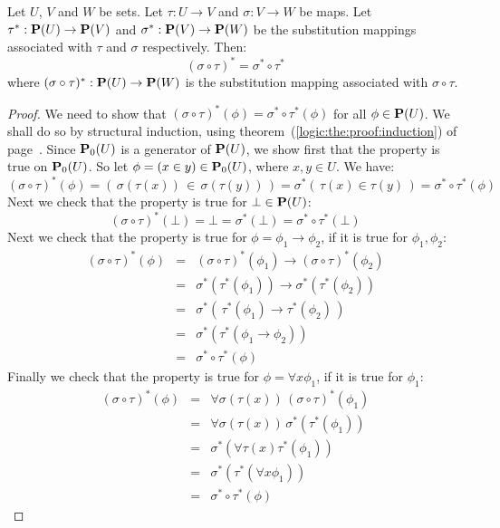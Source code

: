\begin{prop}\label{logic:prop:substitution:composition}
Let $U$, $V$ and $W$ be sets. Let $\tau:U\to V$ and $\sigma:V\to W$
be maps. Let $\tau^{*}:{\bf P}(U)\to\mbox{${\bf P}(V)$}$ and $\sigma^{*}:\mbox{${\bf P}(V)$}\to{\bf
P}(W)$ be the substitution mappings associated with $\tau$ and
$\sigma$ respectively. Then:
    \[
    (\sigma\circ\tau)^{*}=\sigma^{*}\circ\tau^{*}
    \]
where $(\sigma\circ\tau)^{*}:{\bf P}(U)\to {\bf P}(W)$ is the
substitution mapping associated with $\sigma\circ\tau$.
\end{prop}
\begin{proof}
We need to show that
$(\sigma\circ\tau)^{*}(\phi)=\sigma^{*}\circ\tau^{*}(\phi)$ for all
$\phi\in{\bf P}(U)$. We shall do so by structural induction, using
theorem~(\ref{logic:the:proof:induction}) of
page~\pageref{logic:the:proof:induction}. Since ${\bf P}_{0}(U)$ is
a generator of ${\bf P}(U)$, we show first that the property is true
on ${\bf P}_{0}(U)$. So let $\phi = (x\in y)\in{\bf P}_{0}(U)$,
where $x,y\in U$. We have:
    \[
    (\sigma\circ\tau)^{*}(\phi)=(\,\sigma(\tau(x))\,\in\,\sigma(\tau(y))\,)=
    \sigma^{*}(\,\tau(x)\in\tau(y)\,)=\sigma^{*}\circ\tau^{*}(\phi)
    \]
Next we check that the property is true for $\bot\in{\bf P}(U)$:
    \[
    (\sigma\circ\tau)^{*}(\bot)=\bot=\sigma^{*}(\bot)=\sigma^{*}\circ\tau^{*}(\bot)
    \]
Next we check that the property is true for
$\phi=\phi_{1}\to\phi_{2}$, if it is true for $\phi_{1},\phi_{2}$:
    \begin{eqnarray*}
    (\sigma\circ\tau)^{*}(\phi)&=&(\sigma\circ\tau)^{*}(\phi_{1})\to
    (\sigma\circ\tau)^{*}(\phi_{2})\\
    &=&\sigma^{*}(\tau^{*}(\phi_{1}))\to\sigma^{*}(\tau^{*}(\phi_{2}))\\
    &=&\sigma^{*}(\,\tau^{*}(\phi_{1})\to\tau^{*}(\phi_{2})\,)\\
    &=&\sigma^{*}(\tau^{*}(\phi_{1}\to\phi_{2}))\\
    &=&\sigma^{*}\circ\tau^{*}(\phi)
    \end{eqnarray*}
Finally we check that the property is true for $\phi=\forall
x\phi_{1}$, if it is true for $\phi_{1}$:
    \begin{eqnarray*}
    (\sigma\circ\tau)^{*}(\phi)&=&\forall \sigma(\tau(x))\,(\sigma\circ\tau)^{*}(\phi_{1})\\
    &=&\forall\sigma(\tau(x))\,\sigma^{*}(\tau^{*}(\phi_{1}))\\
    &=&\sigma^{*}(\forall\tau(x)\tau^{*}(\phi_{1}))\\
    &=&\sigma^{*}(\tau^{*}(\forall x\phi_{1}))\\
    &=&\sigma^{*}\circ\tau^{*}(\phi)
    \end{eqnarray*}
\end{proof}

